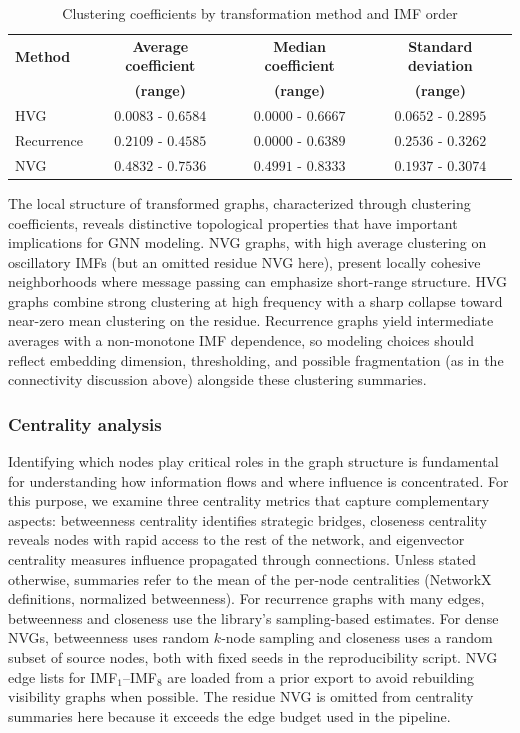 \documentclass[11pt,a4paper]{article}
\begin{document}
\begin{table}[h]
\centering
\caption{Clustering coefficients by transformation method and IMF order}
\label{tab:clustering_coefficients}
\small
\begin{tabular}{lccc}
\toprule
\textbf{Method} & \textbf{Average coefficient} & \textbf{Median coefficient} & \textbf{Standard deviation} \\
 & \textbf{(range)} & \textbf{(range)} & \textbf{(range)} \\
\midrule
HVG & $0.0083$ - $0.6584$ & $0.0000$ - $0.6667$ & $0.0652$ - $0.2895$ \\
Recurrence & $0.2109$ - $0.4585$ & $0.0000$ - $0.6389$ & $0.2536$ - $0.3262$ \\
NVG & $0.4832$ - $0.7536$ & $0.4991$ - $0.8333$ & $0.1937$ - $0.3074$ \\
\bottomrule
\end{tabular}
\end{table}

The local structure of transformed graphs, characterized through clustering coefficients, reveals distinctive topological properties that have important implications for GNN modeling. NVG graphs, with high average clustering on oscillatory IMFs (but an omitted residue NVG here), present locally cohesive neighborhoods where message passing can emphasize short-range structure. HVG graphs combine strong clustering at high frequency with a sharp collapse toward near-zero mean clustering on the residue. Recurrence graphs yield intermediate averages with a non-monotone IMF dependence, so modeling choices should reflect embedding dimension, thresholding, and possible fragmentation (as in the connectivity discussion above) alongside these clustering summaries.

\subsubsection{Centrality analysis}

Identifying which nodes play critical roles in the graph structure is fundamental for understanding how information flows and where influence is concentrated. For this purpose, we examine three centrality metrics that capture complementary aspects: betweenness centrality identifies strategic bridges, closeness centrality reveals nodes with rapid access to the rest of the network, and eigenvector centrality measures influence propagated through connections. Unless stated otherwise, summaries refer to the mean of the per-node centralities (NetworkX definitions, normalized betweenness). For recurrence graphs with many edges, betweenness and closeness use the library's sampling-based estimates. For dense NVGs, betweenness uses random $k$-node sampling and closeness uses a random subset of source nodes, both with fixed seeds in the reproducibility script. NVG edge lists for IMF$_1$--IMF$_8$ are loaded from a prior export to avoid rebuilding visibility graphs when possible. The residue NVG is omitted from centrality summaries here because it exceeds the edge budget used in the pipeline.
\end{document}
